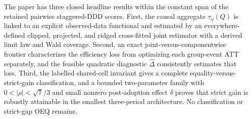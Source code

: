 The paper has three closed headline results within the constant span of the retained pairwise staggered-DDD scores. First, the causal aggregate \(\tau_\omega(Q)\) is linked to an explicit observed-data functional and estimated by an everywhere-defined clipped, projected, and ridged cross-fitted joint estimator with a derived limit law and Wald coverage. Second, an exact joint-versus-componentwise frontier characterizes the efficiency loss from optimizing each group-event ATT separately, and the feasible quadratic diagnostic \(\widehat\Delta\) consistently estimates that loss. Third, the labelled shared-cell invariant gives a complete equality-versus-strict-gain classification, and a bounded two-parameter family with \(0<|\rho|<\sqrt7/3\) and small nonzero post-adoption effect \(\delta\) proves that strict gain is robustly attainable in the smallest three-period architecture. No classification or strict-gap OEQ remains.